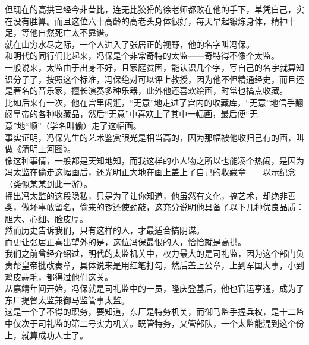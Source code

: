 \begin{multicols}{\theparacolNo}
但现在的高拱已经今非昔比，连无比狡猾的徐老师都败在他的手下，单凭自己，实在没有胜算。而且这位六十高龄的高老头身体很好，每天早起锻炼身体，精神十足，等他自然死亡太不靠谱。\\

就在山穷水尽之际，一个人进入了张居正的视野，他的名字叫冯保。\\

和明代的同行们比起来，冯保是个非常奇特的太监——奇特得不像个太监。\\

一般说来，太监由于出身不好，且家庭贫困，能认识几个字，写自己的名字就算知识分子了，按照这个标准，冯保绝对可以评上教授，因为他不但精通经史，而且还是著名的音乐家，擅长演奏多种乐器，此外他还喜欢绘画，时常也搞点收藏。\\

比如后来有一次，他在宫里闲逛，“无意”地走进了宫内的收藏库，“无意”地信手翻阅皇帝的各种收藏品，然后“无意”中喜欢上了其中一幅画，最后便“无意”地“顺”（学名叫偷）走了这幅画。\\

事实证明，冯保先生的艺术鉴赏眼光是相当高的，因为那幅被他收归己有的画，叫做《清明上河图》。\\

像这种事情，一般都是天知地知，而我这样的小人物之所以也能凑个热闹，是因为冯太监在偷走这幅画后，还光明正大地在画上盖上了自己的收藏章——以示纪念（类似某某到此一游）。\\

捅出冯太监的这段隐私，只是为了让你知道，他虽然有文化，搞艺术，却绝非善类，做坏事敢留名，偷来的锣还使劲敲，这充分说明他具备了以下几种优良品质：胆大、心细、脸皮厚。\\

然而历史告诉我们，只有这样的人，才最适合搞阴谋。\\

而更让张居正喜出望外的是，这位冯保最恨的人，恰恰就是高拱。\\

我们之前曾经介绍过，明代的太监机关中，权力最大的是司礼监，因为这个部门负责帮皇帝批改奏章，具体说来是用红笔打勾，然后盖上公章，上到军国大事，小到鸡皮蒜毛，都得过他们这关。\\

从嘉靖年间开始，冯保就是司礼监中的一员，隆庆登基后，他也官运亨通，成为了东厂提督太监兼御马监管事太监。\\

这是一个了不得的职务，要知道，东厂是特务机关，而御马监手握兵权，是十二监中仅次于司礼监的第二号实力机关。既管特务，又管部队，一个太监能混到这个份上，就算成功人士了。\\


\end{multicols}
